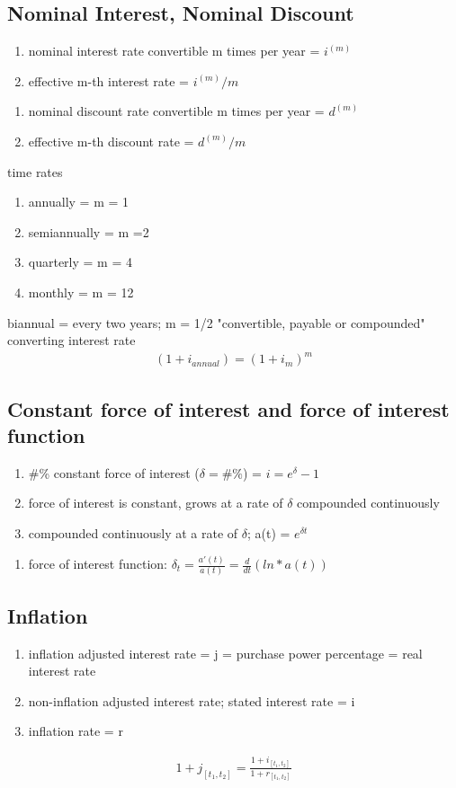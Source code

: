 \documentclass[12pt]{article}
\begin{document}
\subsection{Nominal Interest, Nominal Discount}

\begin{enumerate}
	\item nominal interest rate convertible m times per year = $i^{(m)}$
	\item effective m-th interest rate = $i^{(m)}/m$
\end{enumerate}
\begin{enumerate}
	\item nominal discount rate convertible m times per year = $d^{(m)}$
	\item effective m-th discount rate = $d^{(m)}/m$
\end{enumerate}
time rates
\begin{enumerate}
	\item annually = m = 1
	\item semiannually = m =2
	\item quarterly = m = 4
	\item monthly = m = 12
\end{enumerate}
biannual = every two years; m = 1/2
"convertible, payable or compounded"
converting interest rate
\begin{align}
	(1+i_{annual}) = (1+i_{m})^{m} \nonumber
\end{align}

\subsection{Constant force of interest and force of interest function}
\begin{enumerate}
	\item \#\% constant force of interest ($\delta = \#\%$) = $i = e^{\delta} - 1$
	\item force of interest is constant, grows at a rate of $\delta$ compounded continuously
	\item compounded continuously at a rate of $\delta$; a(t) = $e^{\delta t}$
\end{enumerate}
\begin{enumerate}
	\item force of interest function: $\delta_t = \frac{a'(t)}{a(t)} = \frac{d}{dt}(ln*a(t))$
\end{enumerate}

\subsection{Inflation}
\begin{enumerate}
	\item inflation adjusted interest rate = j = purchase power percentage = real interest rate 
	\item non-inflation adjusted interest rate; stated interest rate = i
	\item inflation rate = r 
\end{enumerate}
\begin{align}
	1 + j_{[t_1,t_2]} = \frac{1 + i_{[t_1, t_2]}}{1 + r_{[t_1,t_2]}} \nonumber
\end{align}
\end{document}
